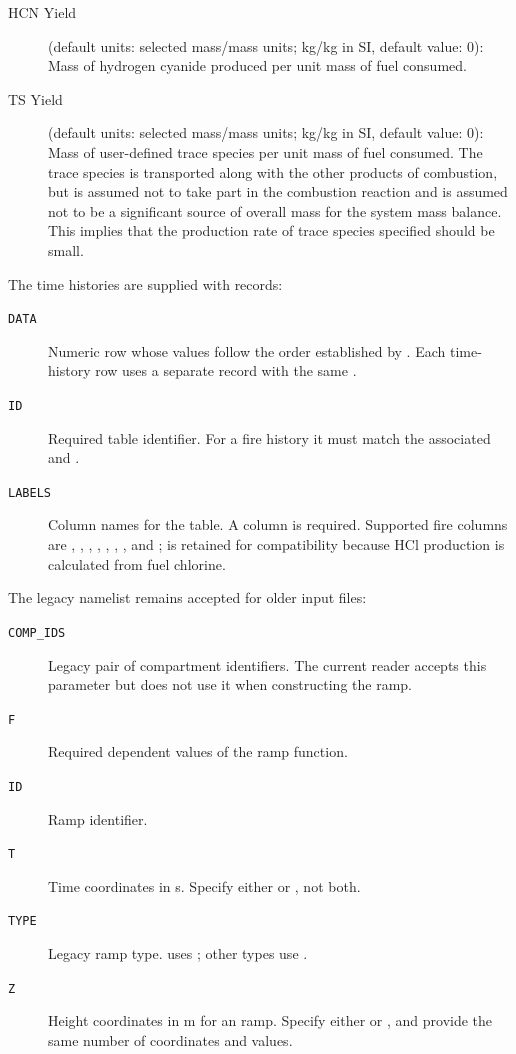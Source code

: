 {{\begin{description}
\item[HCN Yield] (default units: selected mass/mass units; kg/kg in SI, default value: 0): Mass of hydrogen cyanide produced per unit mass of fuel consumed.
\item[TS Yield] (default units: selected mass/mass units; kg/kg in SI, default value: 0): Mass of user-defined trace species per unit mass of fuel consumed. The trace species is transported along with the other products of combustion, but is assumed not to take part in the combustion reaction and is assumed not to be a significant source of overall mass for the system mass balance. This implies that the production rate of trace species specified should be small.
\end{description}

The time histories are supplied with  records:
\begin{description}
\item[\texttt{DATA}] Numeric row whose values follow the order established by . Each time-history row uses a separate  record with the same .
\item[\texttt{ID}] Required table identifier. For a fire history it must match the associated   and  .
\item[\texttt{LABELS}] Column names for the table. A  column is required. Supported fire columns are , , , , , , , and ;  is retained for compatibility because HCl production is calculated from fuel chlorine.
\end{description}

The legacy  namelist remains accepted for older input files:
\begin{description}
\item[\texttt{COMP\_IDS}] Legacy pair of compartment identifiers. The current reader accepts this parameter but does not use it when constructing the ramp.
\item[\texttt{F}] Required dependent values of the ramp function.
\item[\texttt{ID}] Ramp identifier.
\item[\texttt{T}] Time coordinates in s. Specify either  or , not both.
\item[\texttt{TYPE}] Legacy ramp type.  uses ; other types use .
\item[\texttt{Z}] Height coordinates in m for an  ramp. Specify either  or , and provide the same number of coordinates and  values.
\end{description}


}}
